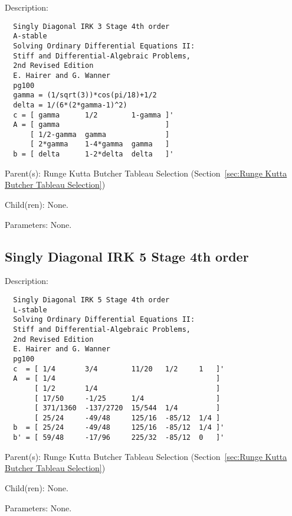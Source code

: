 \begin{list}{}
  {\setlength{\leftmargin}{1.0in}
   \setlength{\labelwidth}{0.75in}
   \setlength{\labelsep}{0.125in}}
  \item[Description:]
\begin{verbatim}
  Singly Diagonal IRK 3 Stage 4th order
  A-stable
  Solving Ordinary Differential Equations II:
  Stiff and Differential-Algebraic Problems,
  2nd Revised Edition
  E. Hairer and G. Wanner
  pg100
  gamma = (1/sqrt(3))*cos(pi/18)+1/2
  delta = 1/(6*(2*gamma-1)^2)
  c = [ gamma      1/2        1-gamma ]'
  A = [ gamma                         ]
      [ 1/2-gamma  gamma              ]
      [ 2*gamma    1-4*gamma  gamma   ]
  b = [ delta      1-2*delta  delta   ]'
\end{verbatim}
  \item[Parent(s):]
    Runge Kutta Butcher Tableau Selection (Section~\ref{sec:Runge Kutta Butcher Tableau Selection})
  \item[Child(ren):]
    None. 
  \item[Parameters:]
    None. 
\end{list}

\subsection{Singly Diagonal IRK 5 Stage 4th order}
\label{sec:Singly Diagonal IRK 5 Stage 4th order}

\begin{list}{}
  {\setlength{\leftmargin}{1.0in}
   \setlength{\labelwidth}{0.75in}
   \setlength{\labelsep}{0.125in}}
  \item[Description:]
\begin{verbatim}
  Singly Diagonal IRK 5 Stage 4th order
  L-stable
  Solving Ordinary Differential Equations II:
  Stiff and Differential-Algebraic Problems,
  2nd Revised Edition
  E. Hairer and G. Wanner
  pg100
  c  = [ 1/4       3/4        11/20   1/2     1   ]'
  A  = [ 1/4                                      ]
       [ 1/2       1/4                            ]
       [ 17/50     -1/25      1/4                 ]
       [ 371/1360  -137/2720  15/544  1/4         ]
       [ 25/24     -49/48     125/16  -85/12  1/4 ]
  b  = [ 25/24     -49/48     125/16  -85/12  1/4 ]'
  b' = [ 59/48     -17/96     225/32  -85/12  0   ]'
\end{verbatim}
  \item[Parent(s):]
    Runge Kutta Butcher Tableau Selection (Section~\ref{sec:Runge Kutta Butcher Tableau Selection})
  \item[Child(ren):]
    None. 
  \item[Parameters:]
    None. 
\end{list}

